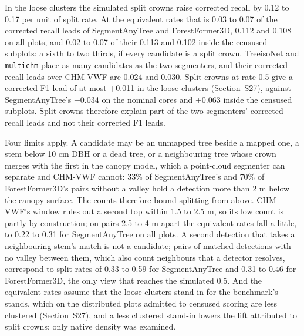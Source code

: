 \documentclass[10pt]{article}
\begin{document}
In the loose clusters the simulated split crowns raise corrected recall by 0.12
to 0.17 per unit of split rate. At the equivalent rates that is 0.03 to 0.07 of
the corrected recall leads of SegmentAnyTree and ForestFormer3D, 0.112 and
0.108 on all plots, and 0.02 to 0.07 of their 0.113 and 0.102 inside the
censused subplots: a sixth to two thirds, if every candidate is a split crown.
TreeisoNet and \texttt{multichm} place as many candidates as the two segmenters, and
their corrected recall leads over CHM-VWF are 0.024 and 0.030. Split crowns at
rate 0.5 give a corrected F1 lead of at most +0.011 in the loose clusters
(Section~S27), against SegmentAnyTree's +0.034 on the nominal cores and +0.063
inside the censused subplots. Split crowns therefore explain part of the two
segmenters' corrected recall leads and not their corrected F1 leads.

Four limits apply. A candidate may be an unmapped tree beside a mapped one, a
stem below 10 cm DBH or a dead tree, or a neighbouring tree whose crown merges
with the first in the canopy model, which a point-cloud segmenter can separate
and CHM-VWF cannot: 33\% of SegmentAnyTree's and 70\% of ForestFormer3D's pairs
without a valley hold a detection more than 2 m below the canopy surface. The
counts therefore bound splitting from above. CHM-VWF's window rules out a
second top within 1.5 to 2.5 m, so its low count is partly by construction; on
pairs 2.5 to 4 m apart the equivalent rates fall a little, to 0.22 to 0.31 for
SegmentAnyTree on all plots. A second detection that takes a neighbouring
stem's match is not a candidate; pairs of matched detections with no valley
between them, which also count neighbours that a detector resolves, correspond
to split rates of 0.33 to 0.59 for SegmentAnyTree and 0.31 to 0.46 for
ForestFormer3D, the only view that reaches the simulated 0.5. And the equivalent
rates assume that the loose clusters stand in for the benchmark's stands, which
on the distributed plots admitted to censused scoring are less clustered
(Section~S27), and a less clustered stand-in lowers the lift attributed to split
crowns; only native density was examined.
\end{document}
